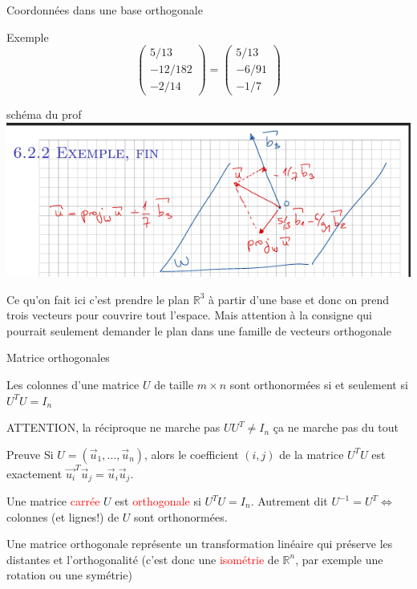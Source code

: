 \begin{parag}{Coordonnées dans une base orthogonale}
\begin{subparag}{Exemple}
\[\begin{pmatrix}
            5/13\\-12/182 \\
            -2/14
        \end{pmatrix} = \begin{pmatrix}
            5/13\\
            -6/91\\
            -1/7
        \end{pmatrix}\]
    \end{subparag}
    \begin{subparag}{schéma du prof}
    \includegraphics[scale = 0.75]{Algèbre linéaire/Screenshot 2024-12-04 101913.png}
    
    \end{subparag}
    \begin{framedremark}
        Ce qu'on fait ici c'est prendre le plan $\mathbb{R}^3$ à partir d'une base et donc on prend trois vecteurs pour couvrire tout l'espace. Mais attention à la consigne qui pourrait seulement demander le plan dans une famille de vecteurs orthogonale
    \end{framedremark}
\end{parag}

\begin{parag}{Matrice orthogonales}
    \begin{theoreme}
        Les colonnes d'une matrice $U$ de taille $m\times n$ sont orthonormées si et seulement si $U^TU = I_n$
    \end{theoreme}
    \begin{framedremark}
        ATTENTION, la réciproque ne marche pas $UU^T \neq I_n$ ça ne marche pas du tout
    \end{framedremark}
    \begin{subparag}{Preuve}
        Si $U = (\vec{u}_1, \dots, \vec{u}_n)$, alors le coefficient $(i, j)$ de la matrice $U^TU$ est exactement $\vec{u_i}^T\vec{u}_j = \vec{u}_i\vec{u}_j$. 
    \end{subparag}
    \begin{definition}
        Une matrice \textcolor{red}{carrée} $U$ est \textcolor{red}{orthogonale} si $U^TU = I_n$. Autrement dit $U^{-1} = U^T \Leftrightarrow$ colonnes (et lignes!) de $U$ sont orthonormées.
    \end{definition}
    Une matrice orthogonale représente un transformation linéaire qui préserve les distantes et l'orthogonalité (c'est donc une \textcolor{red}{isométrie} de $\mathbb{R}^n$, par exemple une rotation ou une symétrie)
\end{parag}

